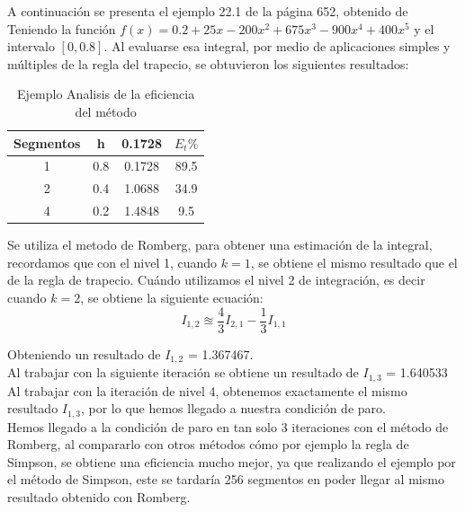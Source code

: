 \documentclass[journal,transmag]{IEEEtran}
\theoremstyle{mytheoremstyle}
\theoremstyle{mytheoremstyle}
\theoremstyle{myproblemstyle}
\begin{document}
    A continuación se presenta el ejemplo 22.1 de la página 652, obtenido de \cite{chapra_mtodos_2007} \\
        
    Teniendo la función $f(x)=0.2 + 25x - 200x^2 + 675x^3 - 900x^4 +400x^5 $ y el intervalo $[0,0.8]$.
    Al evaluarse esa integral, por medio de aplicaciones simples y múltiples de la regla del trapecio, se obtuvieron los siguientes resultados:

    \begin{table}[h]
        \begin{center}
            \caption{Ejemplo Analisis de la eficiencia del método}
            \begin{tabular}{| c | c | c | c |}
                \hline
            Segmentos & h & 0.1728 & ${E_t\%}$ \\ \hline
            1 & 0.8 & 0.1728 & 89.5 \\
            2 & 0.4 & 1.0688 & 34.9 \\
            4 & 0.2 & 1.4848 & 9.5 \\ \hline
            \end{tabular}
            \label{tab:ejemplo}
        \end{center}
            \end{table}
 
        Se utiliza el metodo de Romberg, para obtener una estimación de la integral,
        recordamos que con el nivel 1, cuando $k=1$, se obtiene el mismo resultado que el de la regla de trapecio.
        Cuándo utilizamos el nivel 2 de integración, es decir cuando $k=2$, se obtiene la siguiente ecuación:
        \begin{equation}
            I_{1,2} \approxeq \frac{4}{3}I_{2, 1}-\frac{1}{3}I_{1,1}
        \end{equation}
        
        Obteniendo un resultado de $I_{1,2}$ = 1.367467. \\

        Al trabajar con la siguiente iteración se obtiene un resultado de $I_{1,3}$ = 1.640533 \\

        Al trabajar con la iteración de nivel 4, obtenemos exactamente el mismo resultado $I_{1,3}$, por lo que hemos llegado 
        a nuestra condición de paro. \\

        Hemos llegado a la condición de paro en tan solo 3 iteraciones
        con el método de Romberg, al compararlo con otros métodos cómo por ejemplo
        la regla de Simpson, se obtiene una eficiencia mucho mejor, ya que realizando el ejemplo
        por el método de Simpson, este se tardaría 256 segmentos en poder llegar al mismo resultado
        obtenido con Romberg. \\
\end{document}
